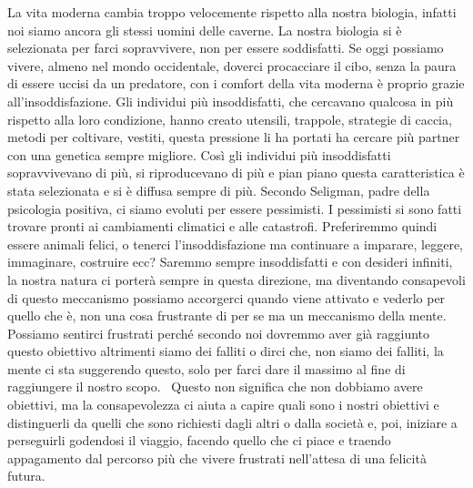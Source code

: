 \documentclass[12pt]{book} %
\begin{document}
La vita moderna cambia troppo velocemente rispetto alla nostra biologia, infatti noi siamo ancora gli stessi uomini
delle caverne. La nostra biologia si è selezionata per farci sopravvivere, non per essere soddisfatti. Se oggi possiamo
vivere, almeno nel mondo occidentale, doverci procacciare il cibo, senza la paura di essere uccisi da un predatore, con
i comfort della vita moderna è proprio grazie all'insoddisfazione. Gli individui più
insoddisfatti, che cercavano qualcosa in più rispetto alla loro condizione, hanno creato utensili, trappole, strategie
di caccia, metodi per coltivare, vestiti, questa pressione li ha portati ha cercare più partner con una genetica sempre
migliore. Così gli individui più insoddisfatti sopravvivevano di più, si riproducevano di più e pian piano questa
caratteristica è stata selezionata e si è diffusa sempre di più. Secondo Seligman, padre della psicologia positiva, ci
siamo evoluti per essere pessimisti. I pessimisti si sono fatti trovare pronti ai cambiamenti climatici e alle
catastrofi. Preferiremmo quindi essere animali felici, o tenerci l'insoddisfazione ma continuare a
imparare, leggere, immaginare, costruire ecc? Saremmo sempre insoddisfatti e con desideri infiniti, la nostra natura ci
porterà sempre in questa direzione, ma diventando consapevoli di questo meccanismo possiamo accorgerci quando viene
attivato e vederlo per quello che è, non una cosa frustrante di per se ma un meccanismo della mente. Possiamo sentirci
frustrati perché secondo noi dovremmo aver già raggiunto questo obiettivo altrimenti siamo dei falliti o dirci che, non
siamo dei falliti, la mente ci sta suggerendo questo, solo per farci dare il massimo al fine di raggiungere il nostro
scopo. \ Questo non significa che non dobbiamo avere obiettivi, ma la consapevolezza ci aiuta a capire quali sono i
nostri obiettivi e distinguerli da quelli che sono richiesti dagli altri o dalla società e, poi, iniziare a perseguirli
godendosi il viaggio, facendo quello che ci piace e traendo appagamento dal percorso più che vivere frustrati
nell'attesa di una felicità futura.
\end{document}
